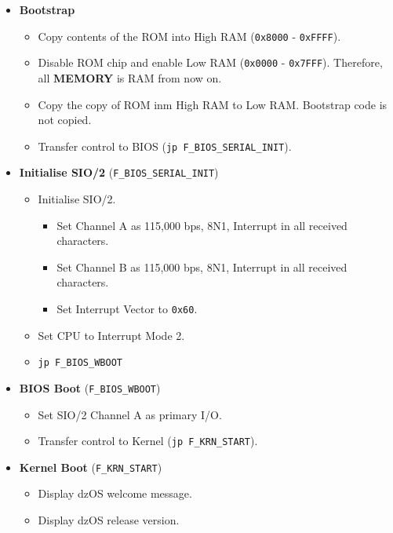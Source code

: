 \documentclass[a4paper,11pt]{article}
\begin{document}
    \begin{itemize}
        \item \textbf{Bootstrap}
        \begin{itemize}
            \item Copy contents of the ROM into High RAM (\texttt{0x8000} - \texttt{0xFFFF}).
            \item Disable ROM chip and enable Low RAM (\texttt{0x0000} - \texttt{0x7FFF}).
            Therefore, all \textbf{MEMORY} is RAM from now on.
            \item Copy the copy of ROM inm High RAM to Low RAM. Bootstrap code is not copied.
            \item Transfer control to BIOS (\texttt{jp F\_BIOS\_SERIAL\_INIT}).
        \end{itemize}
        \item \textbf{Initialise SIO/2} (\texttt{F\_BIOS\_SERIAL\_INIT})
        \begin{itemize}
            \item Initialise SIO/2.
            \begin{itemize}
                \item Set Channel A as 115,000 bps, 8N1, Interrupt in all 
                received characters.
                \item Set Channel B as 115,000 bps, 8N1, Interrupt in all 
                received characters.
                \item Set Interrupt Vector to \texttt{0x60}.
            \end{itemize}
            \item Set CPU to Interrupt Mode 2.
            \item \texttt{jp F\_BIOS\_WBOOT}
        \end{itemize}
        \item \textbf{BIOS Boot} (\texttt{F\_BIOS\_WBOOT})
        \begin{itemize}
            \item Set SIO/2 Channel A as primary I/O.
            \item Transfer control to Kernel (\texttt{jp F\_KRN\_START}).
        \end{itemize}
        \item \textbf{Kernel Boot} (\texttt{F\_KRN\_START})
        \begin{itemize}
            \item Display dzOS welcome message.
            \item Display dzOS release version.

\end{itemize}
\end{itemize}
\end{document}
